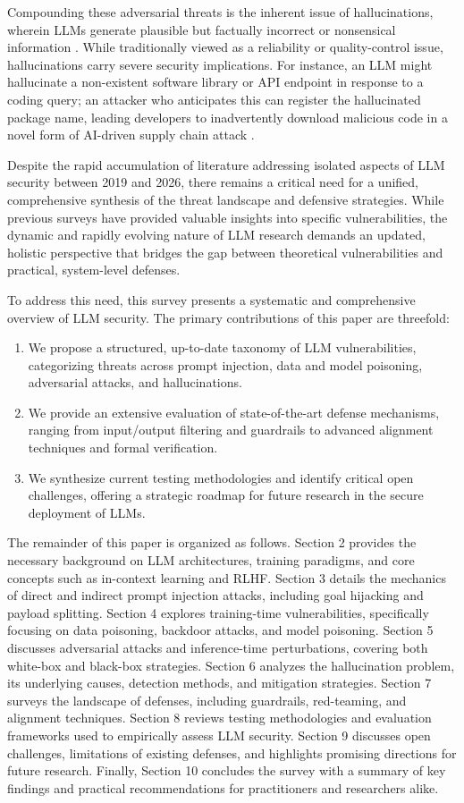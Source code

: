 \documentclass[11pt,a4paper]{article}
\begin{document}
Compounding these adversarial threats is the inherent issue of hallucinations, wherein LLMs generate plausible but factually incorrect or nonsensical information \cite{Ji_2023_Survey}. While traditionally viewed as a reliability or quality-control issue, hallucinations carry severe security implications. For instance, an LLM might hallucinate a non-existent software library or API endpoint in response to a coding query; an attacker who anticipates this can register the hallucinated package name, leading developers to inadvertently download malicious code in a novel form of AI-driven supply chain attack \cite{Vu_2023_Squatting}. 

Despite the rapid accumulation of literature addressing isolated aspects of LLM security between 2019 and 2026, there remains a critical need for a unified, comprehensive synthesis of the threat landscape and defensive strategies. While previous surveys have provided valuable insights into specific vulnerabilities, the dynamic and rapidly evolving nature of LLM research demands an updated, holistic perspective that bridges the gap between theoretical vulnerabilities and practical, system-level defenses. 

To address this need, this survey presents a systematic and comprehensive overview of LLM security. The primary contributions of this paper are threefold:
\begin{enumerate}
  \item We propose a structured, up-to-date taxonomy of LLM vulnerabilities, categorizing threats across prompt injection, data and model poisoning, adversarial attacks, and hallucinations.
  \item We provide an extensive evaluation of state-of-the-art defense mechanisms, ranging from input/output filtering and guardrails to advanced alignment techniques and formal verification.
  \item We synthesize current testing methodologies and identify critical open challenges, offering a strategic roadmap for future research in the secure deployment of LLMs.
\end{enumerate}
The remainder of this paper is organized as follows. Section 2 provides the necessary background on LLM architectures, training paradigms, and core concepts such as in-context learning and RLHF. Section 3 details the mechanics of direct and indirect prompt injection attacks, including goal hijacking and payload splitting. Section 4 explores training-time vulnerabilities, specifically focusing on data poisoning, backdoor attacks, and model poisoning. Section 5 discusses adversarial attacks and inference-time perturbations, covering both white-box and black-box strategies. Section 6 analyzes the hallucination problem, its underlying causes, detection methods, and mitigation strategies. Section 7 surveys the landscape of defenses, including guardrails, red-teaming, and alignment techniques. Section 8 reviews testing methodologies and evaluation frameworks used to empirically assess LLM security. Section 9 discusses open challenges, limitations of existing defenses, and highlights promising directions for future research. Finally, Section 10 concludes the survey with a summary of key findings and practical recommendations for practitioners and researchers alike.
\end{document}
